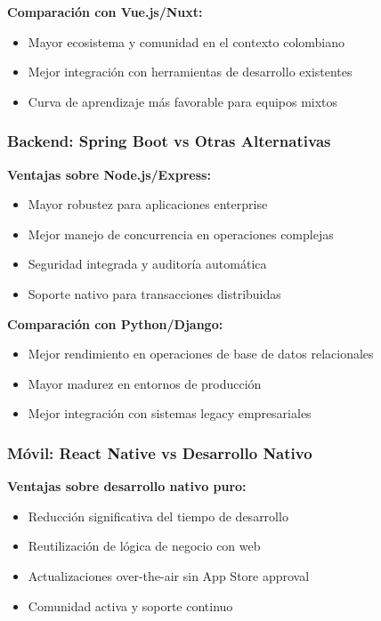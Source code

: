 \textbf{Comparación con Vue.js/Nuxt:}
\begin{itemize}
\item Mayor ecosistema y comunidad en el contexto colombiano
\item Mejor integración con herramientas de desarrollo existentes
\item Curva de aprendizaje más favorable para equipos mixtos
\end{itemize}

\subsubsection{Backend: Spring Boot vs Otras Alternativas}

\textbf{Ventajas sobre Node.js/Express:}
\begin{itemize}
\item Mayor robustez para aplicaciones enterprise
\item Mejor manejo de concurrencia en operaciones complejas
\item Seguridad integrada y auditoría automática
\item Soporte nativo para transacciones distribuidas
\end{itemize}

\textbf{Comparación con Python/Django:}
\begin{itemize}
\item Mejor rendimiento en operaciones de base de datos relacionales
\item Mayor madurez en entornos de producción
\item Mejor integración con sistemas legacy empresariales
\end{itemize}

\subsubsection{Móvil: React Native vs Desarrollo Nativo}

\textbf{Ventajas sobre desarrollo nativo puro:}
\begin{itemize}
\item Reducción significativa del tiempo de desarrollo
\item Reutilización de lógica de negocio con web
\item Actualizaciones over-the-air sin App Store approval
\item Comunidad activa y soporte continuo
\end{itemize}

